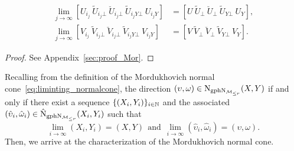\begin{lemma}
\begin{itemize}[left=0cm]
    \begin{equation}\label{eq:subspace_seq}
        \begin{aligned}
            \lim_{j\to\infty}[U_{i_j}\ \tilde{U}_{i_j\bot}\ \breve{U}_{i_j\bot}\ \tilde{U}_{i_jY\bot}\ U_{i_j Y}] &= [U\ \tilde{U}_\bot\ \breve{U}_\bot\ \tilde{U}_{Y\bot}\ U_Y],
            \\
            \lim_{j\to\infty}[V_{i_j}\ \tilde{V}_{i_j\bot}\ \breve{V}_{i_j\bot}\ \tilde{V}_{i_jY\bot}\ V_{i_j Y}] &= [V\ \tilde{V}_\bot\ \breve{V}_\bot\ \tilde{V}_{Y\bot}\ V_Y].
        \end{aligned}
    \end{equation}
    \end{itemize}
\end{lemma}
\begin{proof}
    See Appendix~\ref{sec:proof_Mor}.
\end{proof}




Recalling from the definition of the Mordukhovich normal cone~\eqref{eq:liminting_normalcone}, the direction $(\upsilon,\omega)\in\mathrm{N}_{\mathrm{gph}\mathrm{N}_{\mathcal{M}_{\le r}}}(X,Y)$ if and only if there exist a sequence $\{(X_i,Y_i)\}_{i\in\mathbb{N}}$ and the associated $(\hat{\upsilon}_i,\hat{\omega}_i)\in\hat{\mathrm{N}}_{\mathrm{gph}\mathrm{N}_{\mathcal{M}_{\le r}}}(X_i,Y_i)$ such that 
\begin{equation}\label{eq:limit_viwi}
    \lim_{i\to\infty} (X_i,Y_i)=(X,Y)\ \ \text{and}\ \ \lim_{i\to\infty} (\hat{\upsilon}_i,\hat{\omega}_i)=(\upsilon,\omega).
\end{equation}
Then, we arrive at the characterization of the Mordukhovich normal cone.




